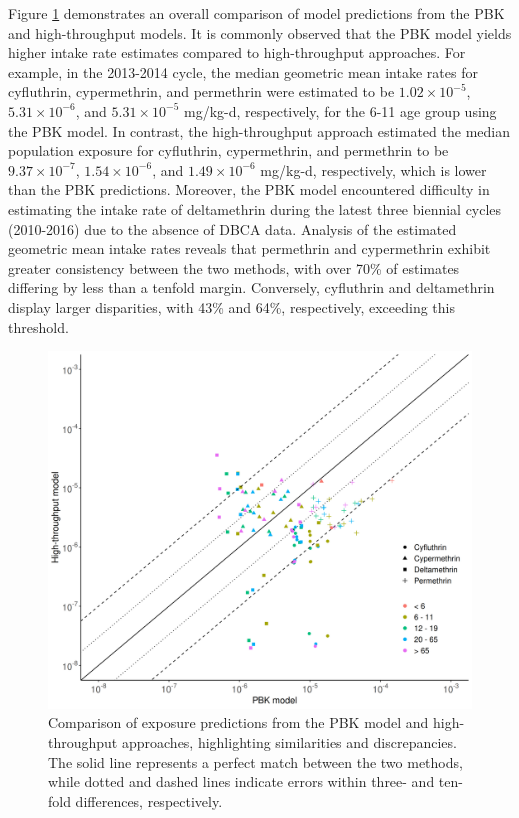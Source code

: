 \documentclass[toxics,article,submit,pdftex,moreauthors]{Definitions/mdpi}
\begin{document}
Figure \ref{fig:fig4} demonstrates an overall comparison of model
predictions from the PBK and high-throughput models. It is commonly
observed that the PBK model yields higher intake rate estimates compared
to high-throughput approaches. For example, in the 2013-2014 cycle, the
median geometric mean intake rates for cyfluthrin, cypermethrin, and
permethrin were estimated to be \(1.02 \times
10^{-5}\), \(5.31 \times 10^{-6}\), and \(5.31 \times 10^{-5}\) mg/kg-d,
respectively, for the 6-11 age group using the PBK model. In contrast,
the high-throughput approach estimated the median population exposure
for cyfluthrin, cypermethrin, and permethrin to be
\(9.37 \times 10^{-7}\), \(1.54
\times 10^{-6}\), and \(1.49 \times 10^{-6}\) mg/kg-d, respectively,
which is lower than the PBK predictions. Moreover, the PBK model
encountered difficulty in estimating the intake rate of deltamethrin
during the latest three biennial cycles (2010-2016) due to the absence
of DBCA data. Analysis of the estimated geometric mean intake rates
reveals that permethrin and cypermethrin exhibit greater consistency
between the two methods, with over 70\% of estimates differing by less
than a tenfold margin. Conversely, cyfluthrin and deltamethrin display
larger disparities, with 43\% and 64\%, respectively, exceeding this
threshold.

\begin{figure}[H]
\centering
\centering
\includegraphics[width=\linewidth]{figures/fig4}
\hfill
\caption{Comparison of exposure predictions from the PBK model and
high-throughput approaches, highlighting similarities and discrepancies. The
solid line represents a perfect match between the two methods, while dotted and
dashed lines indicate errors within three- and ten-fold differences,
respectively.\label{fig:fig4}}
\end{figure}
\end{document}
